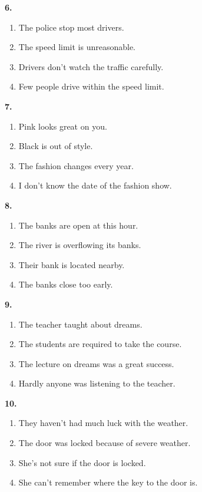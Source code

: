 \documentclass[12pt]{article}
\begin{document}
\par
\vspace{0.25\baselineskip}
\noindent\textbf{6.}
\begin{enumerate}[label=(\Alph*),leftmargin=*,itemsep=0.2em]
\item The police stop most drivers.
\item The speed limit is unreasonable.
\item Drivers don't watch the traffic carefully.
\item Few people drive within the speed limit.
\end{enumerate}
\par
\vspace{0.25\baselineskip}
\noindent\textbf{7.}
\begin{enumerate}[label=(\Alph*),leftmargin=*,itemsep=0.2em]
\item Pink looks great on you.
\item Black is out of style.
\item The fashion changes every year.
\item I don't know the date of the fashion show.
\end{enumerate}
\par
\vspace{0.25\baselineskip}
\noindent\textbf{8.}
\begin{enumerate}[label=(\Alph*),leftmargin=*,itemsep=0.2em]
\item The banks are open at this hour.
\item The river is overflowing its banks.
\item Their bank is located nearby.
\item The banks close too early.
\end{enumerate}
\par
\vspace{0.25\baselineskip}
\noindent\textbf{9.}
\begin{enumerate}[label=(\Alph*),leftmargin=*,itemsep=0.2em]
\item The teacher taught about dreams.
\item The students are required to take the course.
\item The lecture on dreams was a great success.
\item Hardly anyone was listening to the teacher.
\end{enumerate}
\par
\vspace{0.25\baselineskip}
\noindent\textbf{10.}
\begin{enumerate}[label=(\Alph*),leftmargin=*,itemsep=0.2em]
\item They haven't had much luck with the weather.
\item The door was locked because of severe weather.
\item She's not sure if the door is locked.
\item She can't remember where the key to the door is.
\end{enumerate}
\end{document}
